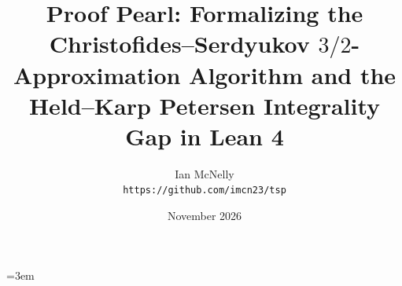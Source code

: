 \documentclass[10pt,twocolumn,a4paper]{article}
\title{\large\textbf{Proof Pearl: Formalizing the Christofides--Serdyukov $3/2$-Approximation Algorithm and the Held--Karp Petersen Integrality Gap in Lean 4}}
\author{\normalsize Ian McNelly \\ \small\texttt{https://github.com/imcn23/tsp}}
\date{\small November 2026}
\theoremstyle{definition}
\theoremstyle{remark}
\renewcommand{\_}{\origunderscore\allowbreak}
\begin{document}
\emergencystretch=3em
\maketitle


\end{document}
